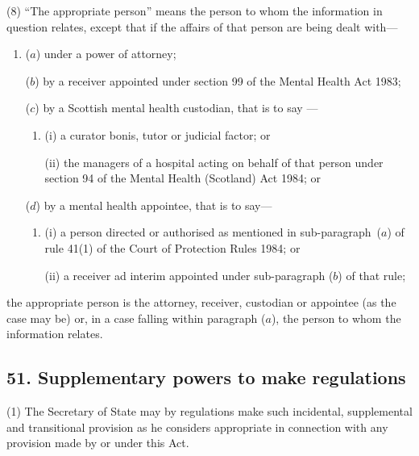 \documentclass[12pt,a4paper]{article}
\begin{document}
(8) “The appropriate person” means the person to whom the information in question relates, except that if the affairs of that person are being dealt with—
\begin{enumerate}\item[]
($a$) under a power of attorney;

($b$) by a receiver appointed under section 99 of the Mental Health Act 1983;

($c$) by a Scottish mental health custodian, that is to say%
—
\begin{enumerate}\item[]
(i) a curator bonis, tutor or judicial factor; or

(ii) the managers of a hospital acting on behalf of that person under section 94 of the Mental Health (Scotland) Act 1984; or
\end{enumerate}

($d$) by a mental health appointee, that is to say—
\begin{enumerate}\item[]
(i) a person directed or authorised as mentioned in sub-\hspace{0pt}paragraph~($a$)  of rule 41(1)  of the Court of Protection Rules 1984; or

(ii) a receiver ad interim appointed under sub-paragraph ($b$)  of that rule;
\end{enumerate}
\end{enumerate}
the appropriate person is the attorney, receiver, custodian or appointee (as the case may be) or, in a case falling within paragraph ($a$), the person to whom the information relates.


\subsection{51. Supplementary powers to make regulations}

(1) The Secretary of State may by regulations make such incidental, supplemental and transitional provision as he considers appropriate in connection with any provision made by or under this Act.
\end{document}
